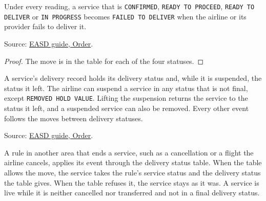 \begin{theorem}
  \label{thm:delivery-fail}
  Under every reading, a service that is \texttt{CONFIRMED},
  \texttt{READY TO PROCEED}, \texttt{READY TO DELIVER} or
  \texttt{IN PROGRESS} becomes \texttt{FAILED TO DELIVER} when the airline
  or its provider fails to deliver it.

  Source: \href{https://standards.atlassian.net/wiki/spaces/EASD/pages/574849062/Order}{EASD guide, Order}.
\end{theorem}
\begin{proof}
  The move is in the table for each of the four statuses.
\end{proof}

\begin{definition}
  \label{def:delivery-suspension}
  A service's delivery record holds its delivery status and, while it is
  suspended, the status it left.  The airline can suspend a service in any
  status that is not final, except \texttt{REMOVED HOLD VALUE}.  Lifting
  the suspension returns the service to the status it left, and a suspended
  service can also be removed.  Every other event follows the moves between
  delivery statuses.

  Source: \href{https://standards.atlassian.net/wiki/spaces/EASD/pages/574849062/Order}{EASD guide, Order}.
\end{definition}

\begin{definition}
  \label{def:delivery-end-from-area}
  A rule in another area that ends a service, such as a cancellation or a
  flight the airline cancels, applies its event through the delivery status
  table.  When the table allows the move, the service takes the rule's
  service status and the delivery status the table gives.  When the table
  refuses it, the service stays as it was.  A service is live while it is
  neither cancelled nor transferred and not in a final delivery status.
\end{definition}

